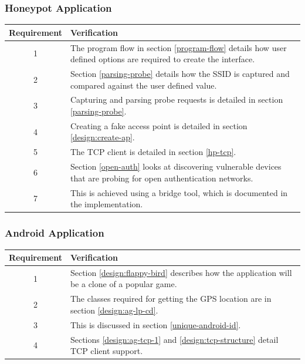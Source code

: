 \subsubsection{Honeypot Application}
\begin{table}[!h]
	\begin{center}
		\begin{tabular}{ | c |  p{12cm} | }
			\hline
			\textbf{Requirement} & \textbf{Verification} \\ \hline
			1 & The program flow in section \ref{program-flow} details how user defined options are required to create the interface.\\ \hline
			2 & Section \ref{parsing-probe} details how the SSID is captured and compared against the user defined value.\\ \hline
			3 & Capturing and parsing probe requests is detailed in section \ref{parsing-probe}. \\ \hline
			4 & Creating a fake access point is detailed in section \ref{design:create-ap}.\\ \hline
			5 & The TCP client is detailed in section \ref{hp-tcp}.\\ \hline
			6 & Section \ref{open-auth} looks at discovering vulnerable devices that are probing for open authentication networks. \\ \hline
			7 & This is achieved using a bridge tool, which is documented in the implementation.\\ 
			\hline
		\end{tabular}
	\end{center}
\end{table}

\subsubsection{Android Application}
\begin{table}[!h]
	\begin{center}
		\begin{tabular}{ | c |  p{12cm} | }
			\hline
			\textbf{Requirement} & \textbf{Verification} \\ \hline
			1 & Section \ref{design:flappy-bird} describes how the application will be a clone of a popular game.\\ \hline
			2 & The classes required for getting the GPS location are in section \ref{design:ag-lp-cd}.\\ \hline
			3 & This is discussed in section \ref{unique-android-id}.\\ \hline
			4 & Sections \ref{design:ag-tcp-1} and \ref{design:tcp-structure} detail TCP client support. \\ 
			\hline
		\end{tabular}
	\end{center}
\end{table}

